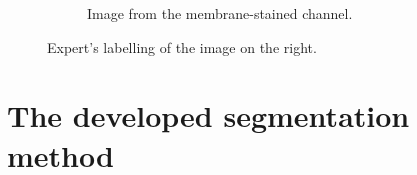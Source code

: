 \documentclass[
  digital,     %
  oneside,     %
  nosansbold,  %
  nocolorbold, %
  lof,         %
  lot,         %
]{fithesis4}
\begin{document}
\begin{figure}
\begin{subfigure}[t]{0.4\textwidth}
        \caption{Image from the membrane-stained channel.}
        \label{fig:label_membrane_channel}
    \end{subfigure}
    \hfill
    \caption{Expert's labelling of the image on the right.}
    \label{fig:labelling_example}
\end{figure}


\chapter{The developed segmentation method}

\end{document}
